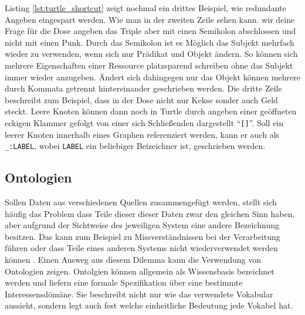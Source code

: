 Listing \ref{lst:turtle_shortcut} zeigt nochmal ein drittes Beispiel, wie redundante Angeben eingespart werden. Wie man in der zweiten Zeile sehen kann. wir deine Frage für die Dose angeben das Triple aber mit einen Semikolon abschlossen und nicht mit einen Punk. Durch das Semikolon ist es Möglich das Subjekt mehrfach wieder zu verwenden, wenn sich nur Prädikat und Objekt ändern. So können sich mehrere Eigenschaften einer Ressource platzsparend schreiben ohne das Subjekt immer wieder anzugeben. Ändert sich dahingegen nur das Objekt können mehrere durch Kommata getrennt hintereinander geschrieben werden. Die dritte Zeile beschreibt zum Beispiel, dass in der Dose nicht nur Kekse sonder auch Geld steckt. Leere Knoten können dann noch in Turtle durch angeben einer geöffneten eckigen Klammer gefolgt von einer sich Schließenden dargestellt \enquote{\texttt{[]}}. Soll ein leerer Knoten innerhalb eines Graphen referenziert werden, kann er auch als \texttt{\_:LABEL}, wobei \texttt{LABEL} ein beliebiger Beizeichner ist, geschrieben werden.




\subsection{Ontologien} %
\label{sub:ontologien}

Sollen Daten aus verschiedenen Quellen zusammengefügt werden, stellt sich häufig das Problem dass Teile dieser dieser Daten zwar den gleichen Sinn haben, aber aufgrund der Sichtweise des jeweiligen System eine andere Bezeichnung besitzen. Das kann zum Beispiel zu Missverständnissen bei der Verarbeitung führen oder dass Teile eines anderen Systems nicht wiederverwendet werden können \cite{Uschold1996a}. Einen Ausweg aus diesem Dilemma kann die Verwendung von Ontologien zeigen. Ontolgien können allgemein als Wissensbasis \cite{Uschold1996a,Hitzler2008a} bezeichnet werden und liefern eine formale Spezifikation über eine bestimmte Interessensdömäne. Sie beschreibt nicht nur wie das verwendete Vokabular aussieht, sondern legt auch fest welche einheitliche Bedeutung jede Vokabel hat. 

